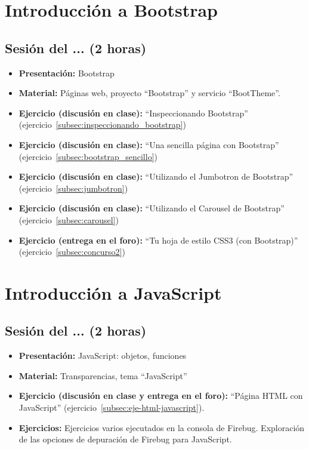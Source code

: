 \documentclass[a4paper,12pt]{report}
\begin{document}
\section{Introducción a Bootstrap}

\subsection{Sesión del ... (2 horas)}

\begin{itemize}
\item \textbf{Presentación:} Bootstrap
\item \textbf{Material:} Páginas web, proyecto ``Bootstrap'' y servicio ``BootTheme''.
\item \textbf{Ejercicio (discusión en clase):} ``Inspeccionando Bootstrap'' (ejercicio~\ref{subsec:inspeccionando_bootstrap})
\item \textbf{Ejercicio (discusión en clase):} ``Una sencilla página con Bootstrap'' (ejercicio~\ref{subsec:bootstrap_sencillo})
\item \textbf{Ejercicio (discusión en clase):} ``Utilizando el Jumbotron de Bootstrap'' (ejercicio~\ref{subsec:jumbotron})
\item \textbf{Ejercicio (discusión en clase):} ``Utilizando el Carousel de Bootstrap'' (ejercicio~\ref{subsec:carousel})
\item \textbf{Ejercicio (entrega en el foro):} ``Tu hoja de estilo CSS3 (con Bootstrap)'' (ejercicio~\ref{subsec:concurso2})
\end{itemize}



\section{Introducción a JavaScript}

\subsection{Sesión del ... (2 horas)}

\begin{itemize}
\item \textbf{Presentación:} JavaScript: objetos, funciones
\item \textbf{Material:} Transparencias, tema ``JavaScript''
\item \textbf{Ejercicio (discusión en clase y entrega en el foro):} ``Página HTML con JavaScript'' (ejercicio~\ref{subsec:eje-html-javascript}).
\item \textbf{Ejercicios:} Ejercicios varios ejecutados en la consola de Firebug. Exploración de las opciones de depuración de Firebug para JavaScript.
\end{itemize}
\end{document}
